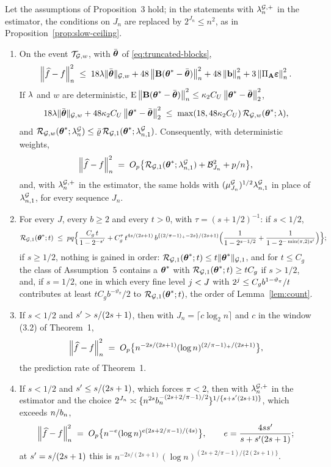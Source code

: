 \begin{proposition}
\label{prop:truncated}
Let the assumptions of Proposition~3 hold; in the statements with $\lambda^{\mathcal{G},+}_{n}$
in the estimator, the conditions on $J_n$ are replaced by $2^{J_n} \le n^{2}$,
as in Proposition~\ref{prop:slow-ceiling}.
\begin{enumerate}
\item[(i)] On the event $\mathcal{T}_{\mathcal{G},w}$, with $\bar{\boldsymbol{\theta}}$ of \eqref{eq:truncated-blocks},
\[
  \left\lVert \widehat{f}-f \right\rVert_{n}^{2}
  \;\le\; 18\lambda\lVert \bar{\boldsymbol{\theta}}\rVert_{\mathcal{G},w} + 48\left\lVert \mathbf{B}(\boldsymbol{\theta}^{*}-\bar{\boldsymbol{\theta}}) \right\rVert_{n}^{2}
  + 48\left\lVert \mathbf{b} \right\rVert_{n}^{2} + 3\left\lVert \Pi_{\mathbf{A}}\boldsymbol{\varepsilon} \right\rVert_{n}^{2} .
\]
If $\lambda$ and $w$ are deterministic,
$\mathrm{E}\left\lVert \mathbf{B}(\boldsymbol{\theta}^{*}-\bar{\boldsymbol{\theta}}) \right\rVert_{n}^{2} \le
\kappa_2C_U\left\lVert \boldsymbol{\theta}^{*}-\bar{\boldsymbol{\theta}} \right\rVert_{2}^{2}$,
\[
  18\lambda\lVert \bar{\boldsymbol{\theta}}\rVert_{\mathcal{G},w} + 48\kappa_2C_U\left\lVert \boldsymbol{\theta}^{*}-\bar{\boldsymbol{\theta}} \right\rVert_{2}^{2}
  \;\le\; \max(18,48\kappa_2C_U)\,\mathcal{R}_{\mathcal{G},w}(\boldsymbol{\theta}^{*};\lambda),
\]
and $\mathcal{R}_{\mathcal{G},w}(\boldsymbol{\theta}^{*};\lambda^{\mathcal{G}}_{n}) \le \bar\varrho\,\mathcal{R}_{\mathcal{G},1}(\boldsymbol{\theta}^{*};\lambda^{\mathcal{G}}_{n,1})$.
Consequently, with deterministic weights,
\[
  \left\lVert \widehat{f}-f \right\rVert_{n}^{2} \;=\; O_p\bigl\{\mathcal{R}_{\mathcal{G},1}(\boldsymbol{\theta}^{*};\lambda^{\mathcal{G}}_{n,1})
  + \mathcal{B}_{J_n}^{2} + p/n\bigr\},
\]
and, with $\lambda^{\mathcal{G},+}_{n}$ in the estimator, the same holds with
$(\mu^{\mathcal{G}}_{J_n})^{1/2}\lambda^{\mathcal{G}}_{n,1}$ in place of $\lambda^{\mathcal{G}}_{n,1}$, for every sequence
$J_n$.
\item[(ii)] For every $J$, every $b \ge 2$ and every $t > 0$, with
$\tau = (s+1/2)^{-1}$: if $s < 1/2$,
\begin{equation}
  \label{eq:count-truncated}
  \mathcal{R}_{\mathcal{G},1}(\boldsymbol{\theta}^{*};t) \;\le\; pq\Bigl\{\frac{C_g\,t}{1-2^{-s'}}
  + C_g^{\tau}\,t^{4s/(2s+1)}\,b^{\{(2/\pi-1)_{+}-2s\}/(2s+1)}
  \Bigl(\frac{1}{1-2^{s-1/2}} + \frac{1}{1-2^{-\min(\pi,2)s'}}\Bigr)\Bigr\};
\end{equation}
if $s \ge 1/2$, nothing is gained in order: $\mathcal{R}_{\mathcal{G},1}(\boldsymbol{\theta}^{*};t) \le
t\lVert \boldsymbol{\theta}^{*}\rVert_{\mathcal{G},1}$, and for $t \le C_g$ the class of Assumption~5 contains a
$\boldsymbol{\theta}^{*}$ with $\mathcal{R}_{\mathcal{G},1}(\boldsymbol{\theta}^{*};t) \ge tC_g$ if $s > 1/2$, and, if
$s = 1/2$, one in which every fine level $j < J$ with
$2^{j} \le C_gb^{1-\vartheta_{\pi}}/t$ contributes at least
$tC_gb^{-\vartheta_{\pi}}/2$ to $\mathcal{R}_{\mathcal{G},1}(\boldsymbol{\theta}^{*};t)$, the order of
Lemma~\ref{lem:count}.
\item[(iii)] If $s < 1/2$ and $s' > s/(2s+1)$, then with
$J_n = \lceil c\log_2 n\rceil$ and $c$ in the window (3.2) of Theorem~1,
\[
  \left\lVert \widehat{f}-f \right\rVert_{n}^{2}
  \;=\; O_p\bigl\{n^{-2s/(2s+1)}(\log n)^{(2/\pi-1)_{+}/(2s+1)}\bigr\},
\]
the prediction rate of Theorem~1.
\item[(iv)] If $s < 1/2$ and $s' \le s/(2s+1)$, which forces $\pi < 2$,
then with $\lambda^{\mathcal{G},+}_{n}$ in the estimator and the choice
$2^{J_n} \asymp \{n^{2s}b_{n}^{-(2s+2/\pi-1)/2}\}^{1/\{s+s'(2s+1)\}}$, which
exceeds $n/b_{n}$,
\[
  \left\lVert \widehat{f}-f \right\rVert_{n}^{2}
  \;=\; O_p\bigl\{n^{-e}(\log n)^{e(2s+2/\pi-1)/(4s)}\bigr\},
  \qquad e = \frac{4ss'}{s+s'(2s+1)} ;
\]
at $s' = s/(2s+1)$ this is
$n^{-2s/(2s+1)}(\log n)^{(2s+2/\pi-1)/\{2(2s+1)\}}$.
\end{enumerate}
\end{proposition}

